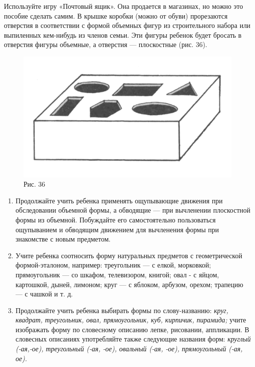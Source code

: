 \documentclass[a5paper]{book}
\renewcommand{\emph}[1]{\textit{#1}}
\begin{document}
Используйте игру «Почтовый ящик». Она продается в магазинах, но можно
это пособие сделать самим. В крышке коробки (можно от обуви) прорезаются
отверстия в соответствии с формой объемных фигур из строительного набора
или выпиленных кем-нибудь из членов семьи. Эти фигуры ребенок будет
бросать в отверстия фигуры объемные, а отверстия --- плоскостные (рис.
36).

\begin{figure}
\centering
\includegraphics[width=\linewidth]{media/media/image33.png}
\caption*{Рис. 36}
\end{figure}



\begin{enumerate}
\def\labelenumi{\arabic{enumi}.}
\setcounter{enumi}{4}
\item
  
  Продолжайте учить ребенка применять ощупывающие движения при
  обследовании объемной формы, а обводящие --- при вычленении
  плоскостной формы из объемной. Побуждайте его самостоятельно
  пользоваться ощупыванием и обводящим движением для вычленения формы
  при знакомстве с новым предметом.
  
\item
  
  Учите ребенка соотносить форму натуральных предметов с геометрической
  формой-эталоном, например: треугольник --- с елкой, морковкой;
  прямоугольник --- со шкафом, телевизором, книгой; овал - с яйцом,
  картошкой, дыней, лимоном; круг --- с яблоком, арбузом, орехом;
  трапецию --- с чашкой и т. д.
  
\item
  
  Продолжайте учить ребенка выбирать формы по слову-названию:
  \emph{круг, квадрат, треугольник, овал, прямоугольник, куб, кирпичик,
  пирамида;} учите изображать форму по словесному описанию лепке,
  рисовании, аппликации. В словесных описаниях употребляйте также
  следующие названия форм: \emph{круглый (-ая,-ое), треугольный (-ая,
  -ое), овальный (-ая, -ое), прямоугольный (-ая, ое).}
  
\end{enumerate}
\end{document}
